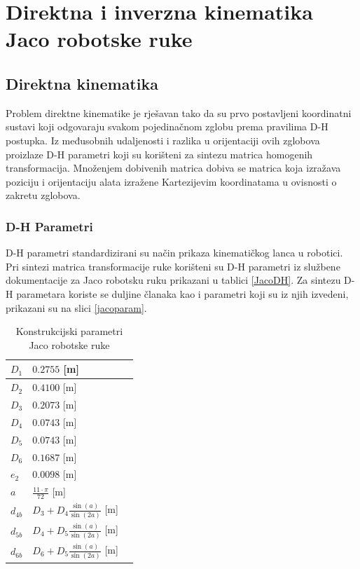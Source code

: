 \documentclass[times, utf8, diplomski, numeric]{fer}
\begin{document}
\section{Direktna i inverzna kinematika Jaco robotske ruke}\label{direkt i inverz}
\subsection{Direktna kinematika}
Problem direktne kinematike je rješavan tako da su prvo postavljeni koordinatni sustavi koji odgovaraju svakom pojedinačnom zglobu prema pravilima D-H postupka.
Iz međusobnih udaljenosti i razlika u orijentaciji ovih zglobova proizlaze D-H parametri koji su korišteni za sintezu matrica homogenih transformacija.
Množenjem dobivenih matrica dobiva se matrica koja izražava poziciju i orijentaciju alata izražene Kartezijevim koordinatama u ovisnosti o zakretu zglobova.
 
\subsubsection{D-H Parametri}
D-H parametri standardizirani su način prikaza kinematičkog lanca u robotici.
Pri sintezi matrica transformacije ruke korišteni su D-H parametri iz službene dokumentacije za Jaco robotsku ruku prikazani u tablici \ref{JacoDH}. 
Za sintezu D-H parametara koriste se duljine članaka kao i parametri koji su iz njih izvedeni, prikazani su na slici \ref{jacoparam}.

\begin{table}[h!]
    \centering
    \begin{tabular}{ | l | l | l |}
    \hline
    $D_{1}$ & $0.2755$ [m] \\ \hline
    $D_{2}$  & $0.4100$ [m] \\ \hline
    $D_{3}$  & $0.2073$ [m] \\ \hline
    $D_{4}$  & $0.0743$ [m] \\ \hline
    $D_{5}$  & $0.0743$ [m] \\ \hline
    $D_{6}$  & $0.1687$ [m] \\ \hline
    $e_{2}$  & $0.0098$ [m] \\ \hline
    $a$  & $\frac{11\cdot\pi}{72}$ [m] \\ \hline
    $d_{4b}$  & $D_{3}+D_{4}\frac{\sin(a)}{\sin(2a)}$ [m] \\ \hline
    $d_{5b}$  & $D_{4}+D_{5}\frac{\sin(a)}{\sin(2a)}$ [m] \\ \hline
    $d_{6b}$  & $D_{6}+D_{5}\frac{\sin(a)}{\sin(2a)}$ [m] \\ \hline
    \end{tabular}
    \caption{Konstrukcijski parametri Jaco robotske ruke}
\end{table}
\end{document}

